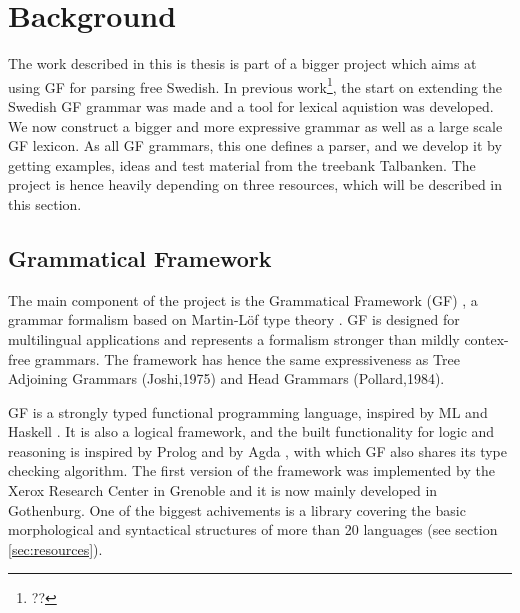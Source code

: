 \documentclass{report}
\begin{document}
\chapter{Background}  
\label{sec:background}
The work described in this is thesis is part of a bigger project which aims at
using GF for parsing free Swedish. 
In previous work\footnote{??}, the start on extending the Swedish GF grammar was
made and a tool for lexical aquistion was developed.
We now construct a bigger
and more expressive grammar as well as a large scale GF lexicon.
As all GF grammars, this one defines a parser, and we develop it by getting
examples, ideas and test material from the treebank Talbanken.
The project is hence heavily depending on three resources, which will be described
in this section.

\section{Grammatical Framework}
\label{sec:gf}
The main component of the project is the Grammatical Framework (GF) \cite{gfbok}, %
a grammar formalism based on Martin-Löf type theory \cite{martinlof}. GF is
designed for multilingual applications and represents a formalism
stronger than mildly contex-free grammars. The framework has  hence the same expressiveness
as Tree Adjoining Grammars (Joshi,1975) and Head Grammars (Pollard,1984).

GF is a strongly typed functional programming language, inspired by
ML \cite{ml} and Haskell \cite{haskell}. It is also a logical framework,
and the built functionality for logic and reasoning 
is inspired by \textlambda Prolog \cite{prolog} and 
by Agda \cite{agda}, with which GF also shares its type checking algorithm.
The first version of the framework was implemented by the Xerox Research Center
in Grenoble and it is now mainly developed in Gothenburg. One of the biggest
achivements is a library covering the 
basic morphological and syntactical structures of more than
20 languages (see section \ref{sec:resources}).
\end{document}
